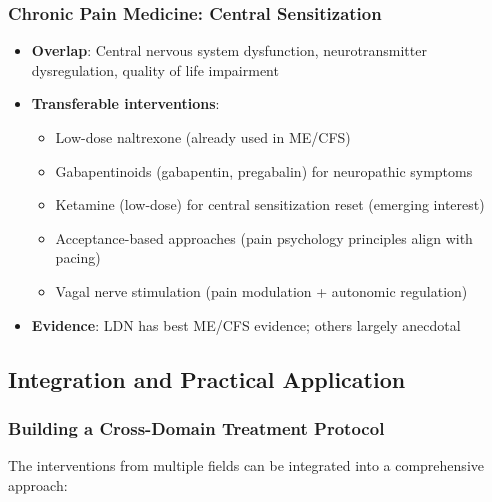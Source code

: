 \subsubsection{Chronic Pain Medicine: Central Sensitization}

\begin{itemize}
    \item \textbf{Overlap}: Central nervous system dysfunction, neurotransmitter dysregulation, quality of life impairment
    \item \textbf{Transferable interventions}:
    \begin{itemize}
        \item Low-dose naltrexone (already used in ME/CFS)
        \item Gabapentinoids (gabapentin, pregabalin) for neuropathic symptoms
        \item Ketamine (low-dose) for central sensitization reset (emerging interest)
        \item Acceptance-based approaches (pain psychology principles align with pacing)
        \item Vagal nerve stimulation (pain modulation + autonomic regulation)
    \end{itemize}
    \item \textbf{Evidence}: LDN has best ME/CFS evidence; others largely anecdotal
\end{itemize}

\subsection{Integration and Practical Application}
\label{subsec:cross-domain-integration}

\subsubsection{Building a Cross-Domain Treatment Protocol}

The interventions from multiple fields can be integrated into a comprehensive approach:

